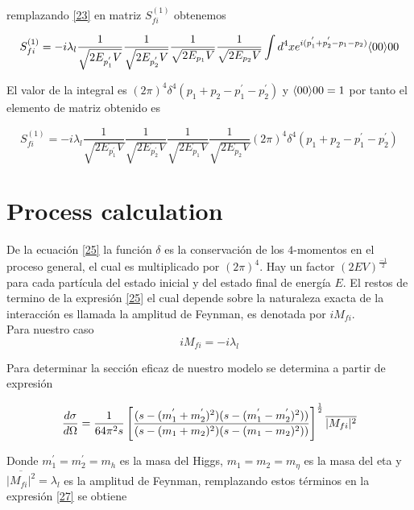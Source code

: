 remplazando \ref{23} en matriz $S_{fi}^{(1)}$ obtenemos

\begin{equation}
S_{fi}^{(1)}=-i\lambda_{l}\frac{1}{\sqrt{2E_{p_{1}^{'}}V}}\frac{1}{\sqrt{2E_{p_{2}^{'}}V}}\frac{1}{\sqrt{2E_{p_{1}}V}}\frac{1}{\sqrt{2E_{p_{2}}V}}\int d^{4}x e^{i(p_{1}^{'}+p_{2}^{'}-p_{1}-p_{2})}\langle{00}\rangle{00}
\label{24}
\end{equation}


El valor de la integral es $(2\pi)^{4}\delta^{4}(p_{1}+p_{2}-p_{1}^{'}-p_{2}^{'})$ y $\langle{00}\rangle{00}=1$ por tanto el elemento de matriz obtenido es

\begin{equation}
S_{fi}^{(1)}=-i\lambda_{l}\frac{1}{\sqrt{2E_{p_{1}^{'}}V}}\frac{1}{\sqrt{2E_{p_{2}^{'}}V}}\frac{1}{\sqrt{2E_{p_{1}}V}}\frac{1}{\sqrt{2E_{p_{2}}V}}(2\pi)^{4}\delta^{4}(p_{1}+p_{2}-p_{1}^{'}-p_{2}^{'})
\label{25}
\end{equation}



\section{Process calculation}

 De la ecuación \ref{25} la función $\delta$  es la conservación de los $4$-momentos en el proceso general, el cual es multiplicado por $(2\pi)^{4}$. Hay un factor $(2EV)^{\frac{-1}{2} }$ para cada partícula del estado inicial y del estado final de energía $E$. El restos de termino de la expresión \ref{25} el cual depende sobre la naturaleza exacta de la interacción es llamada la amplitud de Feynman, es denotada por $iM_{fi}$.\\
 Para nuestro caso  
 \begin{equation}
iM_{fi}= -i\lambda_{l}
  \label{26}
 \end{equation}
              
   Para determinar la sección eficaz de nuestro modelo se determina a partir de expresión\cite{3}
   
   \begin{equation}
\frac{d\sigma}{d\Omega}=\frac{1}{64 \small{\pi} ^{2}s}\left[\frac{(s-(m_{1}^{'}+m_{2}^{'})^{2})(s-(m_{1}^{'}-m_{2}^{'})^{2}))}{(s-(m_{1}+m_{2})^{2})(s-(m_{1}-m_{2})^{2}))}\right]^{\frac{1}{2}}\overline{\vert M_{fi}\vert^{2}}
   \label{27}
   \end{equation}            
              
     Donde $m_{1}^{'}=m_{2}^{'}=m_{h}$ es la masa del Higgs, $m_{1}=m_{2}=m_{\eta}$ es la masa del eta y  $\overline{\vert M_{fi}\vert^{2}}=\lambda_{l}$ es la amplitud de Feynman, remplazando estos términos en la expresión \ref{27} se obtiene
     
